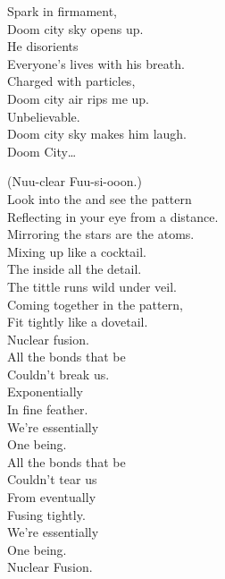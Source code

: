 Spark in firmament, \\
Doom city sky opens up. \\
He disorients \\
Everyone's lives with his breath. \\
Charged with particles, \\
Doom city air rips me up. \\
Unbelievable. \\
Doom city sky makes him laugh. \\

Doom City… \\





(Nuu-clear Fuu-si-ooon.) \\

Look into the  and see the pattern \\
Reflecting in your eye from a distance. \\
Mirroring the stars are the atoms. \\
Mixing up like a cocktail. \\

The  inside all the detail. \\
The tittle runs wild under veil. \\
Coming together in the pattern, \\
Fit tightly like a dovetail. \\

Nuclear fusion. \\

All the bonds that be \\
Couldn't break us. \\
Exponentially \\
In fine feather. \\
We're essentially \\
One being. \\

All the bonds that be \\
Couldn't tear us \\
From eventually \\
Fusing tightly. \\
We're essentially \\
One being. \\
Nuclear Fusion. \\

